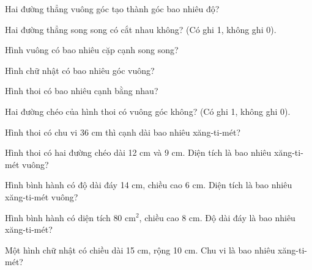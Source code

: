 \begin{ex}
Hai đường thẳng vuông góc tạo thành góc bao nhiêu độ?
\end{ex}

\begin{ex}
Hai đường thẳng song song có cắt nhau không? (Có ghi 1, không ghi 0).
\end{ex}

\begin{ex}
Hình vuông có bao nhiêu cặp cạnh song song?
\end{ex}

\begin{ex}
Hình chữ nhật có bao nhiêu góc vuông?
\end{ex}

\begin{ex}
Hình thoi có bao nhiêu cạnh bằng nhau?
\end{ex}

\begin{ex}
Hai đường chéo của hình thoi có vuông góc không? (Có ghi 1, không ghi 0).
\end{ex}

\begin{ex}
Hình thoi có chu vi 36 cm thì cạnh dài bao nhiêu xăng-ti-mét?
\end{ex}

\begin{ex}
Hình thoi có hai đường chéo dài 12 cm và 9 cm. Diện tích là bao nhiêu xăng-ti-mét vuông?
\end{ex}

\begin{ex}
Hình bình hành có độ dài đáy 14 cm, chiều cao 6 cm. Diện tích là bao nhiêu xăng-ti-mét vuông?
\end{ex}

\begin{ex}
Hình bình hành có diện tích $80\text{ cm}^2$, chiều cao 8 cm. Độ dài đáy là bao nhiêu xăng-ti-mét?
\end{ex}

\begin{ex}
Một hình chữ nhật có chiều dài 15 cm, rộng 10 cm. Chu vi là bao nhiêu xăng-ti-mét?
\end{ex}

